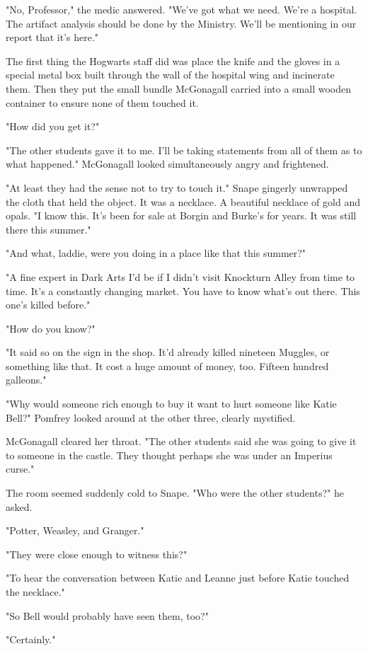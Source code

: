\documentclass[a4paper,11pt]{article}
\begin{document}
"No, Professor," the medic answered. "We've got what we need. We're a hospital. The artifact analysis should be done by the Ministry. We'll be mentioning in our report that it's here."

The first thing the Hogwarts staff did was place the knife and the gloves in a special metal box built through the wall of the hospital wing and incinerate them. Then they put the small bundle McGonagall carried into a small wooden container to ensure none of them touched it.

"How did you get it?"

"The other students gave it to me. I'll be taking statements from all of them as to what happened." McGonagall looked simultaneously angry and frightened.

"At least they had the sense not to try to touch it." Snape gingerly unwrapped the cloth that held the object. It was a necklace. A beautiful necklace of gold and opals. "I know this. It's been for sale at Borgin and Burke's for years. It was still there this summer."

"And what, laddie, were you doing in a place like that this summer?"

"A fine expert in Dark Arts I'd be if I didn't visit Knockturn Alley from time to time. It's a constantly changing market. You have to know what's out there. This one's killed before."

"How do you know?"

"It said so on the sign in the shop. It'd already killed nineteen Muggles, or something like that. It cost a huge amount of money, too. Fifteen hundred galleons."

"Why would someone rich enough to buy it want to hurt someone like Katie Bell?" Pomfrey looked around at the other three, clearly mystified.

McGonagall cleared her throat. "The other students said she was going to give it to someone in the castle. They thought perhaps she was under an Imperius curse."

The room seemed suddenly cold to Snape. "Who were the other students?" he asked.

"Potter, Weasley, and Granger."

"They were close enough to witness this?"

"To hear the conversation between Katie and Leanne just before Katie touched the necklace."

"So Bell would probably have seen them, too?"

"Certainly."
\end{document}
